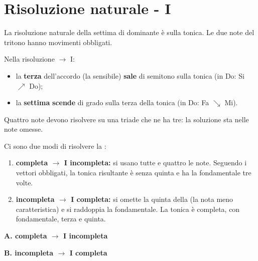 \section{Risoluzione naturale  - I}
\label{sec:risoluzione_v7}

La risoluzione naturale della settima di dominante è sulla tonica. Le due note del tritono hanno movimenti obbligati.

\begin{regola}
	\label{reg:vettori_obbligati}
	Nella risoluzione  $\rightarrow$ I:
	\begin{itemize}
		\item la \textbf{terza} dell'accordo (la sensibile) \textbf{sale} di semitono sulla tonica (in Do: Si $\nearrow$ Do);
		\item la \textbf{settima} \textbf{scende} di grado sulla terza della tonica (in Do: Fa $\searrow$ Mi).
	\end{itemize}
\end{regola}

Quattro note devono risolvere su una triade che ne ha tre: la soluzione sta nelle note omesse.

\begin{definizione}
	\label{def:v7_completa_incompleta}
	Ci sono due modi di risolvere la :
	\begin{enumerate}
		\item \textbf{ completa $\rightarrow$ I incompleta:} si usano tutte e quattro le note. Seguendo i vettori obbligati, la tonica risultante è senza quinta e ha la fondamentale tre volte.
		\item \textbf{ incompleta $\rightarrow$ I completa:} si omette la quinta della  (la nota meno caratteristica) e si raddoppia la fondamentale. La tonica è completa, con fondamentale, terza e quinta.
	\end{enumerate}
\end{definizione}

\begin{esempio}
	\label{ex:due_risoluzioni_v7}
	\textbf{A.  completa $\rightarrow$ I incompleta}

	\vspace{1cm}
	\textbf{B.  incompleta $\rightarrow$ I completa}
\end{esempio}

